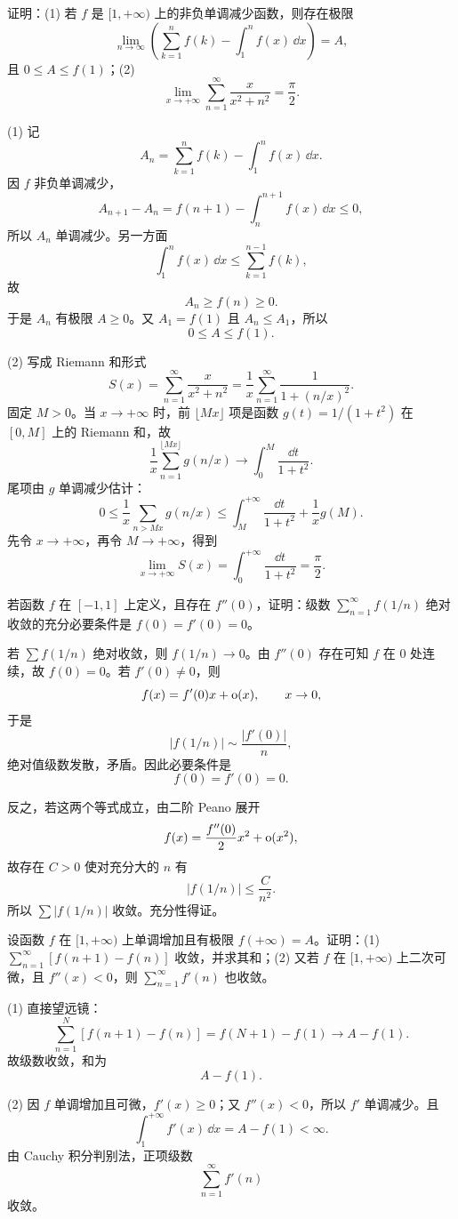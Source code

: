 \begin{xreferenceproblem}[6]
证明：(1) 若 $f$ 是 $[1,+\infty)$ 上的非负单调减少函数，则存在极限
\[
\lim_{n\to\infty}\left(\sum_{k=1}^{n}f(k)-\int_1^n f(x)\,\dd x\right)=A,
\]
且 $0\leq A\leq f(1)$；(2)
\[
\lim_{x\to+\infty}\sum_{n=1}^{\infty}\frac{x}{x^2+n^2}=\frac\pi2.
\]
\end{xreferenceproblem}
\begin{xsolution}
(1) 记
\[
 A_n=\sum_{k=1}^{n}f(k)-\int_1^n f(x)\,\dd x.
\]
因 $f$ 非负单调减少，
\[
 A_{n+1}-A_n
 =f(n+1)-\int_n^{n+1}f(x)\,\dd x\leq0,
\]
所以 $A_n$ 单调减少。另一方面
\[
 \int_1^n f(x)\,\dd x
 \leq\sum_{k=1}^{n-1}f(k),
\]
故
\[
 A_n\geq f(n)\geq0.
\]
于是 $A_n$ 有极限 $A\geq0$。又 $A_1=f(1)$ 且 $A_n\leq A_1$，所以
\[
 0\leq A\leq f(1).
\]

(2) 写成 Riemann 和形式
\[
 S(x)=\sum_{n=1}^{\infty}\frac{x}{x^2+n^2}
 =\frac1x\sum_{n=1}^{\infty}\frac1{1+(n/x)^2}.
\]
固定 $M>0$。当 $x\to+\infty$ 时，前 $\lfloor Mx\rfloor$ 项是函数 $g(t)=1/(1+t^2)$ 在 $[0,M]$ 上的 Riemann 和，故
\[
 \frac1x\sum_{n=1}^{\lfloor Mx\rfloor}g(n/x)
 \longrightarrow\int_0^M\frac{\dd t}{1+t^2}.
\]
尾项由 $g$ 单调减少估计：
\[
 0\leq\frac1x\sum_{n> Mx}g(n/x)
 \leq\int_M^{+\infty}\frac{\dd t}{1+t^2}+\frac1x g(M).
\]
先令 $x\to+\infty$，再令 $M\to+\infty$，得到
\[
 \lim_{x\to+\infty}S(x)
 =\int_0^{+\infty}\frac{\dd t}{1+t^2}
 =\boxed{\frac\pi2}.
\]
\end{xsolution}


\begin{xreferenceproblem}[7]
若函数 $f$ 在 $[-1,1]$ 上定义，且存在 $f''(0)$，证明：级数 $\sum_{n=1}^{\infty}f(1/n)$ 绝对收敛的充分必要条件是 $f(0)=f'(0)=0$。
\end{xreferenceproblem}
\begin{xsolution}
若 $\sum f(1/n)$ 绝对收敛，则 $f(1/n)\to0$。由 $f''(0)$ 存在可知 $f$ 在 $0$ 处连续，故 $f(0)=0$。若 $f'(0)\neq0$，则
\[
 f(x)=f'(0)x+\mathrm{o}(x),\qquad x\to0,
\]
于是
\[
 |f(1/n)|\sim\frac{|f'(0)|}{n},
\]
绝对值级数发散，矛盾。因此必要条件是
\[
 f(0)=f'(0)=0.
\]

反之，若这两个等式成立，由二阶 Peano 展开
\[
 f(x)=\frac{f''(0)}2x^2+\mathrm{o}(x^2),
\]
故存在 $C>0$ 使对充分大的 $n$ 有
\[
 |f(1/n)|\leq\frac C{n^2}.
\]
所以 $\sum|f(1/n)|$ 收敛。充分性得证。
\end{xsolution}


\begin{xreferenceproblem}[8]
设函数 $f$ 在 $[1,+\infty)$ 上单调增加且有极限 $f(+\infty)=A$。证明：(1) $\sum_{n=1}^{\infty}[f(n+1)-f(n)]$ 收敛，并求其和；(2) 又若 $f$ 在 $[1,+\infty)$ 上二次可微，且 $f''(x)<0$，则 $\sum_{n=1}^{\infty}f'(n)$ 也收敛。
\end{xreferenceproblem}
\begin{xsolution}
(1) 直接望远镜：
\[
 \sum_{n=1}^{N}[f(n+1)-f(n)]=f(N+1)-f(1)\longrightarrow A-f(1).
\]
故级数收敛，和为
\[
 \boxed{A-f(1)}.
\]

(2) 因 $f$ 单调增加且可微，$f'(x)\geq0$；又 $f''(x)<0$，所以 $f'$ 单调减少。且
\[
 \int_1^{+\infty}f'(x)\,\dd x
 =A-f(1)<\infty.
\]
由 Cauchy 积分判别法，正项级数
\[
 \sum_{n=1}^{\infty}f'(n)
\]
收敛。
\end{xsolution}


